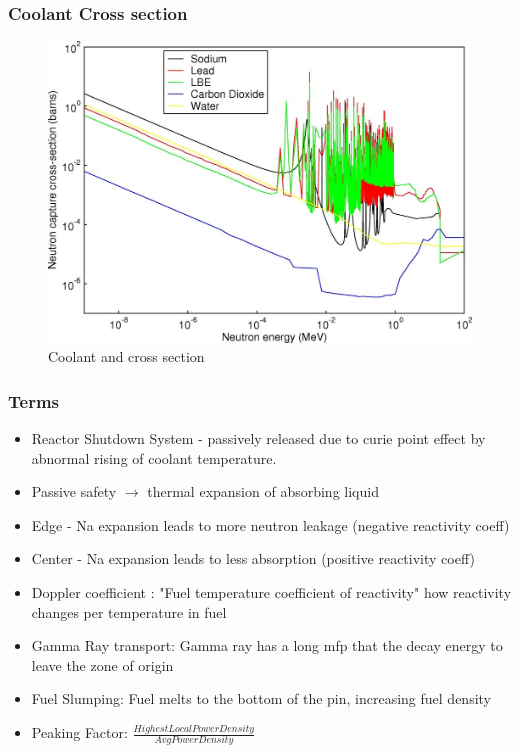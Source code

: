 \documentclass[9pt]{beamer}
\begin{document}


\begin{frame}
\frametitle{Coolant Cross section}
\begin{figure}[htbp!]
  \begin{center}
      \includegraphics[scale=0.7]{./images/coolant.jpg}
  \end{center}
  \caption{Coolant and cross section \cite{stacey_nuclear_2007}}
  \label{fig:reac}
\end{figure}
\end{frame}


\begin{frame}
\frametitle{Terms}
\begin{itemize}
  \item Reactor Shutdown System - passively released due to curie point effect by abnormal rising of coolant temperature.
  \item Passive safety $\rightarrow$ thermal expansion of absorbing liquid
  \item Edge - Na expansion leads to more neutron leakage (negative reactivity coeff)
  \item Center - Na expansion leads to less absorption (positive reactivity coeff)
  \item Doppler coefficient : "Fuel temperature coefficient of reactivity" how reactivity changes per temperature in fuel
  \item Gamma Ray transport: Gamma ray has a long mfp that the decay energy to leave the zone of origin
  \item Fuel Slumping: Fuel melts to the bottom of the pin, increasing fuel density
  \item Peaking Factor: $\frac{Highest Local Power Density}{Avg Power Density}$
\end{itemize}
\end{frame}
\end{document}
